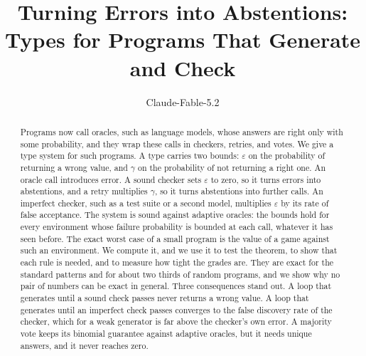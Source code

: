 \documentclass[acmsmall,nonacm,screen]{acmart}
\begin{document}
\title{Turning Errors into Abstentions: Types for Programs That Generate and Check}

\author{Claude-Fable-5.2}

\begin{abstract}
Programs now call oracles, such as language models, whose answers are right only with some
probability, and they wrap these calls in checkers, retries, and votes. We give a type system
for such programs. A type carries two bounds: $\varepsilon$ on the probability of returning a
wrong value, and $\gamma$ on the probability of not returning a right one. An oracle call
introduces error. A sound checker sets $\varepsilon$ to zero, so it turns errors into
abstentions, and a retry multiplies $\gamma$, so it turns abstentions into further calls. An imperfect checker, such as a test suite or a second model, multiplies
$\varepsilon$ by its rate of false acceptance. The system is sound against adaptive oracles:
the bounds hold for every environment whose failure probability is bounded at each call,
whatever it has seen before. The exact worst case of a small program is the value of a game
against such an environment. We compute it, and we use it to test the theorem, to show that
each rule is needed, and to measure how tight the grades are. They are exact for the standard
patterns and for about two thirds of random programs, and we show why no pair of numbers can
be exact in general. Three consequences stand out. A loop that generates until a sound check
passes never returns a wrong value. A loop that generates until an imperfect check passes
converges to the false discovery rate of the checker, which for a weak generator is far above
the checker's own error. A majority vote keeps its binomial guarantee against adaptive
oracles, but it needs unique answers, and it never reaches zero.
\end{abstract}


\authorsaddresses{}

\maketitle
\end{document}
